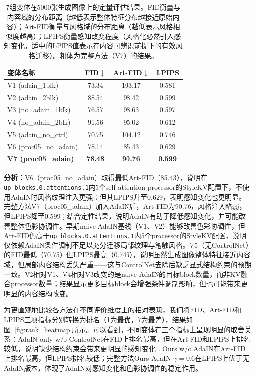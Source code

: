 \documentclass[10pt,twocolumn]{article}
\begin{document}
\begin{table}[htbp]
  \centering
  \caption{7组变体在5000张生成图像上的定量评估结果。FID衡量与内容域的分布距离（越低表示整体特征分布越接近原始内容）；Art-FID衡量与风格域的分布距离（越低表示风格相似度越高）；LPIPS衡量感知改变程度（风格化必然引入感知变化，适中的LPIPS值表示在内容可辨识前提下的有效风格迁移）。粗体为完整方法（V7）的结果。}
  \label{tab:quant_results}
  \small
  \setlength{\tabcolsep}{3pt}
  \begin{tabular}{lccc}
    \toprule
    变体名称 & FID$\downarrow$ & Art-FID$\downarrow$ & LPIPS \\
    \midrule
    V1 (adain\_1blk)       & 73.34 & 103.17 & 0.581 \\
    V2 (adain\_2blk)       & 88.54 & 98.42  & 0.599 \\
    V3 (no\_adain\_1blk)   & 76.57 & 98.63  & 0.597 \\
    V4 (no\_adain\_2blk)   & 91.56 & 95.02  & 0.612 \\
    V5 (adain\_no\_ctrl)   & 70.75 & 104.12 & 0.746 \\
    V6 (proc05\_no\_adain) & 78.14 & 85.43  & 0.629 \\
    \textbf{V7 (proc05\_adain)} & \textbf{78.48} & \textbf{90.76} & \textbf{0.599} \\
    \bottomrule
  \end{tabular}
\end{table}

\textbf{分析：}V6（proc05\_no\_adain）取得最低Art-FID（85.43），说明在\texttt{up\_blocks.0.attentions.1}内5个self-attention processor的StyleKV配置下，不使用AdaIN时风格纹理注入更强；但其LPIPS升至0.629，表明感知变化也更明显。完整方法V7（proc05\_adain）加入AdaIN后，Art-FID为90.76，风格注入略弱，但LPIPS降至0.599；结合定性结果，说明AdaIN有助于降低感知变化，并可能改善整体色彩协调性。早期naive AdaIN基线（V1、V2）能够改善色彩协调性，但Art-FID仍高于\texttt{up\_blocks.0.attentions.1}内5个processor的StyleKV配置，说明仅依赖AdaIN条件调制不足以充分迁移局部纹理与笔触风格。V5（无ControlNet）的FID最低（70.75）但LPIPS最高（0.746），说明虽然生成图像整体特征接近内容域，但局部内容结构丢失严重——这与ControlNet去除后缺乏显式结构约束的预期一致。V2相对V1、V4相对V3改变的是naive AdaIN的目标block数量，而非KV融合processor数量；结果显示更多目标block会增强条件调制影响，但也可能带来更明显的内容结构改变。

为更直观地比较各方法在不同评价维度上的相对表现，我们将FID、Art-FID和LPIPS三项指标分别转换为排名（1为最优，7为最差），结果如图~\ref{fig:rank_heatmap}所示。可以看到，不同变体在三个指标上呈现明显的取舍关系：AdaIN-only w/o ControlNet在FID上排名最高，但在Art-FID和LPIPS上排名较低，说明缺少结构约束会带来更明显的感知变化；Ours w/o AdaIN在Art-FID上排名最高，但LPIPS排名较低；完整方法Ours AdaIN $\gamma=0.6$在LPIPS上优于无AdaIN版本，体现了AdaIN对感知变化和色彩协调性的稳定作用。
\end{document}
